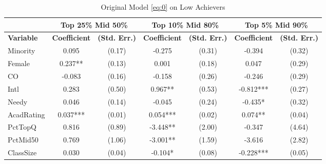 \begin{sidewaystable}[htb]\centering
  \begin{threeparttable}
    \caption{Original Model \eqref{eq:0} on Low Achievers}\label{table:c2}
    \begin{tabular}{l|c|c|c|c|c|c}
      \hline\hline 
                        & \multicolumn{2}{|c|}{Top 25\% Mid 50\%} & \multicolumn{2}{|c|}{Top 10\% Mid 80\%} & \multicolumn{2}{|c}{Top 5\% Mid 90\%} \\
      \hline
      \textbf{Variable} & \textbf{Coefficient}         & \textbf{(Std. Err.)}         & \textbf{Coefficient} & \textbf{(Std. Err.)} & \textbf{Coefficient} & \textbf{(Std. Err.)} \\ 
      \hline
      \hline 
      Minority            &       0.095                       &      (0.17)   &      -0.275                       &      (0.31)   &      -0.394                       &      (0.32)   \\
      Female              &       0.237**                     &      (0.13)   &       0.001                       &      (0.18)   &       0.047                       &      (0.29)   \\
      CO                  &      -0.083                       &      (0.16)   &      -0.158                       &      (0.26)   &      -0.246                       &      (0.29)   \\
      Intl                &       0.283                       &      (0.50)   &       0.967**                     &      (0.53)   &      -0.812***                    &      (0.27)   \\
      Needy               &       0.046                       &      (0.14)   &      -0.045                       &      (0.24)   &      -0.435*                      &      (0.32)   \\
      AcadRating          &       0.037***                    &      (0.01)   &       0.054***                    &      (0.02)   &       0.074**                     &      (0.04)   \\
      PctTopQ             &       0.816                       &      (0.89)   &      -3.448**                     &      (2.00)   &      -0.347                       &      (4.64)   \\
      PctMid50            &       0.769                       &      (1.06)   &      -3.001**                     &      (1.59)   &      -3.616                       &      (2.82)   \\
      ClassSize           &       0.030                       &      (0.04)   &      -0.104*                      &      (0.08)   &      -0.228***                    &      (0.05)   \\

\end{tabular}
\end{threeparttable}
\end{sidewaystable}
